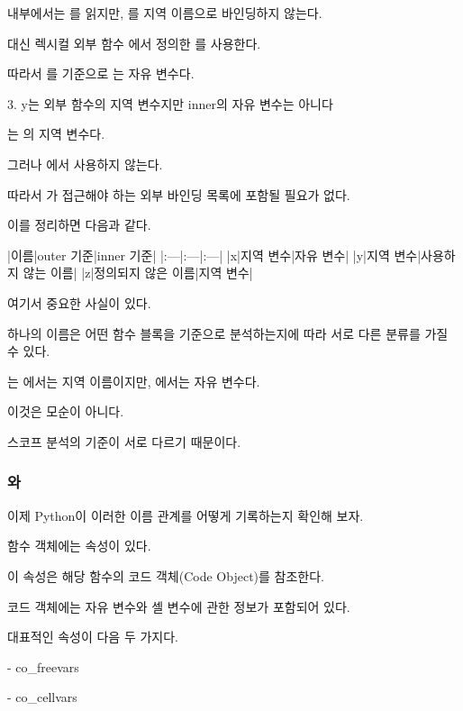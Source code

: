  내부에서는 를 읽지만, 를 지역 이름으로 바인딩하지 않는다.

대신 렉시컬 외부 함수 에서 정의한 를 사용한다.

따라서 를 기준으로 는 자유 변수다.

\begin{dhknote}
\begin{dhksmry}[centered]
3. y는 외부 함수의 지역 변수지만 inner의 자유 변수는 아니다
\end{dhksmry}
\end{dhknote}

는 의 지역 변수다.

그러나 에서 사용하지 않는다.

따라서 가 접근해야 하는 외부 바인딩 목록에 포함될 필요가 없다.

이를 정리하면 다음과 같다.

\begin{dhktable}
|이름|outer 기준|inner 기준|
|:---|:---|:---|
|x|지역 변수|자유 변수|
|y|지역 변수|사용하지 않는 이름|
|z|정의되지 않은 이름|지역 변수|
\end{dhktable}

여기서 중요한 사실이 있다.

하나의 이름은 어떤 함수 블록을 기준으로 분석하는지에 따라 서로 다른 분류를 가질 수 있다.

는 에서는 지역 이름이지만, 에서는 자유 변수다.

이것은 모순이 아니다.

스코프 분석의 기준이 서로 다르기 때문이다.

\subsubsection{와 }

이제 Python이 이러한 이름 관계를 어떻게 기록하는지 확인해 보자.

함수 객체에는  속성이 있다.

이 속성은 해당 함수의 코드 객체(Code Object)를 참조한다.

코드 객체에는 자유 변수와 셀 변수에 관한 정보가 포함되어 있다.

대표적인 속성이 다음 두 가지다.

\begin{dhksmry}
    - co_freevars

    - co_cellvars
\end{dhksmry}

